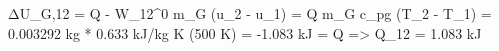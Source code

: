 ΔU_G,12 = Q - W_12^0  
m_G (u_2 - u_1) = Q  
m_G c_pg (T_2 - T_1) = 0.003292 kg * 0.633 kJ/kg K (500 K) = -1.083 kJ = Q  
=> Q_12 = 1.083 kJ